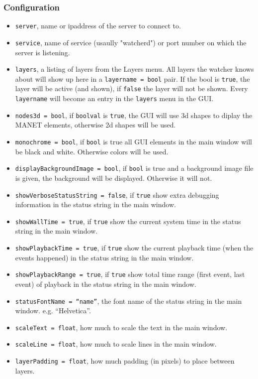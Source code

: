 \subsubsection{Configuration}
\begin{itemize}
\item {\tt server}, name or ipaddress of the server to connect to.
\item {\tt service}, name of service (usaully "watcherd") or port number on which the server is listening.
\item {\tt layers}, a listing of layers from the Layers menu. All layers the watcher knows about will show up here in a {\tt layername = bool} pair. 
If the bool is {\tt true}, the layer will be active (and shown), if {\tt false} the layer will not be shown. Every {\tt layername} will become
an entry in the {\tt layers} menu in the GUI.
\item {\tt nodes3d = bool}, if {\tt boolval} is {\tt true}, the GUI will use 3d shapes to diplay the MANET elements, otherwise 2d shapes will be used.
\item {\tt monochrome = bool}, if {\tt bool} is true all GUI elements in the main window will be black and white. Otherwise colors will be used. 
\item {\tt displayBackgroundImage = bool}, if {\tt bool} is true and a background image file is given, the background will be displayed. Otherwise it will not.
\item {\tt showVerboseStatusString = false}, if {\tt true} show extra debugging information in the status string in the main window.
\item {\tt showWallTime = true}, if {\tt true} show the current system time in the status string in the main window.
\item {\tt showPlaybackTime = true}, if {\tt true} show the current playback time (when the events happened) in the status string in the main window.
\item {\tt showPlaybackRange = true}, if {\tt true} show total time range (first event, last event) of playback in the status string in the main window.
\item {\tt statusFontName = ``name''}, the font name of the status string in the main window. e.g. ``Helvetica''. 
\item {\tt scaleText = float}, how much to scale the text in the main window.
\item {\tt scaleLine = float}, how much to scale lines in the main window.
\item {\tt layerPadding = float}, how much padding (in pixels) to place between layers. 

\end{itemize}

